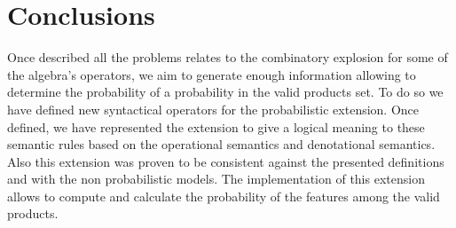 \section{Conclusions}
\label{section:jstat:concs}

Once described all the problems relates to the combinatory explosion
for some of the algebra's operators, we aim to generate enough information
allowing to determine the probability of a probability in the valid
products set.
%
To do so we have defined new syntactical operators for the probabilistic
extension. Once defined, we have represented the extension to give a logical
meaning to these semantic rules based on the operational semantics
and denotational semantics.
%
Also this extension was proven to be consistent against the presented definitions
and with the non probabilistic models.
%
The implementation of this extension allows to compute and calculate the probability of the features among the valid products.
